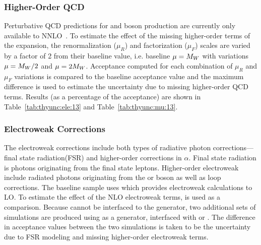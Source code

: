 
\subsubsection{Higher-Order QCD}
Perturbative QCD predictions for \W and \Z boson production are currently only available to NNLO~\cite{Melnikov:2006kv,Catani:2009sm}. To estimate the effect of the missing higher-order terms of the expansion, the renormalization ($\mu_R$) and factorization ($\mu_F$) scales are varied by a factor of 2 from their baseline value, i.e. baseline $\mu = M_{W}$ with variations $\mu=M_{W}/2$ and $\mu=2M_{W}$. Acceptance computed for each combination of $\mu_R$ and $\mu_F$ variations is compared to the baseline acceptance value and the maximum difference is used to estimate the uncertainty due to missing higher-order QCD terms. Results (as a percentage of the acceptance) are shown in Table~\ref{tab:thyunc:ele:13} and Table~\ref{tab:thyunc:mu:13}.


\subsubsection{Electroweak Corrections}\label{ch:ewkcorr}
The electroweak corrections include both types of radiative photon corrections---final state radiation(FSR) and higher-order corrections in $\alpha$. Final state radiation is photons originating from the final state leptons. Higher-order electroweak include radiated photons originating from the \W or \Z boson as well as loop corrections. The baseline sample uses  which provides electroweak calculations to LO. To estimate the effect of the NLO electroweak terms, \PHOTOS \cite{Golonka:2005pn} is used as a comparison. Because \PHOTOS cannot be interfaced to the \aMCATNLO generator, two additional sets of simulations are produced using \POWHEG as a generator, interfaced with \PHOTOS or . The difference in acceptance values between the two simulations is taken to be the uncertainty due to FSR modeling and missing higher-order electroweak terms. 


% 
% 

% 
% 


